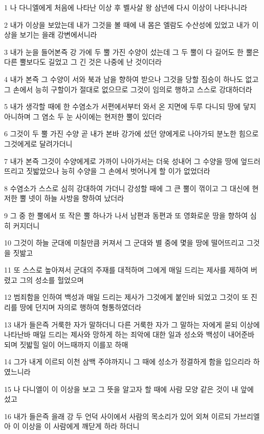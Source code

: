 \par 1 나 다니엘에게 처음에 나타난 이상 후 벨사살 왕 삼년에 다시 이상이 나타나니라
\par 2 내가 이상을 보았는데 내가 그것을 볼 때에 내 몸은 엘람도 수산성에 있었고 내가 이상을 보기는 을래 강변에서니라
\par 3 내가 눈을 들어본즉 강 가에 두 뿔 가진 수양이 섰는데 그 두 뿔이 다 길어도 한 뿔은 다른 뿔보다도 길었고 그 긴 것은 나중에 난 것이더라
\par 4 내가 본즉 그 수양이 서와 북과 남을 향하여 받으나 그것을 당할 짐승이 하나도 없고 그 손에서 능히 구할이가 절대로 없으므로 그것이 임의로 행하고 스스로 강대하더라
\par 5 내가 생각할 때에 한 수염소가 서편에서부터 와서 온 지면에 두루 다니되 땅에 닿지 아니하며 그 염소 두 눈 사이에는 현저한 뿔이 있더라
\par 6 그것이 두 뿔 가진 수양 곧 내가 본바 강가에 섰던 양에게로 나아가되 분노한 힘으로 그것에게로 달려가더니
\par 7 내가 본즉 그것이 수양에게로 가까이 나아가서는 더욱 성내어 그 수양을 땅에 엎드러뜨리고 짓밟았으나 능히 수양을 그 손에서 벗어나게 할 이가 없었더라
\par 8 수염소가 스스로 심히 강대하여 가더니 강성할 때에 그 큰 뿔이 꺾이고 그 대신에 현저한 뿔 넷이 하늘 사방을 향하여 났더라
\par 9 그 중 한 뿔에서 또 작은 뿔 하나가 나서 남편과 동편과 또 영화로운 땅을 향하여 심히 커지더니
\par 10 그것이 하늘 군대에 미칠만큼 커져서 그 군대와 별 중에 몇을 땅에 떨어뜨리고 그것을 짓밞고
\par 11 또 스스로 높아져서 군대의 주재를 대적하며 그에게 매일 드리는 제사를 제하여 버렸고 그의 성소를 헐었으며
\par 12 범죄함을 인하여 백성과 매일 드리는 제사가 그것에게 붙인바 되었고 그것이 또 진리를 땅에 던지며 자의로 행하여 형통하였더라
\par 13 내가 들은즉 거룩한 자가 말하더니 다른 거룩한 자가 그 말하는 자에게 묻되 이상에 나타난바 매일 드리는 제사와 망하게 하는 죄악에 대한 일과 성소와 백성이 내어준바 되며 짓밟힐 일이 어느때까지 이를꼬 하매
\par 14 그가 내게 이르되 이천 삼백 주야까지니 그 때에 성소가 정결하게 함을 입으리라 하였느니라
\par 15 나 다니엘이 이 이상을 보고 그 뜻을 알고자 할 때에 사람 모양 같은 것이 내 앞에 섰고
\par 16 내가 들은즉 을래 강 두 언덕 사이에서 사람의 목소리가 있어 외쳐 이르되 가브리엘아 이 이상을 이 사람에게 깨닫게 하라 하더니
